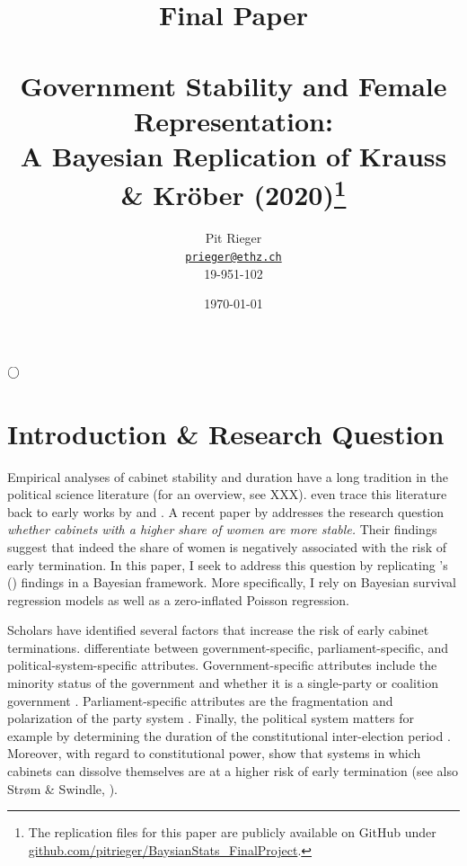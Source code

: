 \documentclass[11pt]{article}
\title{\large Final Paper \\ ~ \\
\LARGE  Government Stability and Female Representation:\\
A Bayesian Replication of Krauss \& Kröber (2020)\footnote[1]{The replication files for this paper are publicly available on GitHub under \url{github.com/pitrieger/BaysianStats_FinalProject}.}}
\author{Pit Rieger\\
    \href{mailto:prieger@ethz.ch}{\texttt{prieger@ethz.ch}}\\
    19-951-102}
\date{\today}
\newcommand\possecite[1]{\citeauthor{#1}'s (\citeyear{#1})}
\begin{document}
\maketitle

\bigskip
\bigskip
\bigskip
\bigskip
\begin{center}
    $\Huge \bigcirc$
\end{center}
\bigskip
\bigskip
\bigskip
\bigskip

\begin{abstract}
{\noindent\itshape
\lipsum[1]
}
\end{abstract}

\bigskip
\bigskip
\bigskip
\bigskip

\newpage


\section{Introduction \& Research Question}
Empirical analyses of cabinet stability and duration have a long tradition in the political science literature (for an overview, see XXX). \textcite{LupiaStrøm1995} even trace this literature back to early works by \textcite{Bryce1921} and \textcite{Lowell1896}. A recent paper by \textcite{KK20} addresses the research question \textit{whether cabinets with a higher share of women are more stable.} Their findings suggest that indeed the share of women is negatively associated with the risk of early termination. In this paper, I seek to address this question by replicating \possecite{KK20} findings in a Bayesian framework. More specifically, I rely on Bayesian survival regression models as well as a zero-inflated Poisson regression. 

Scholars have identified several factors that increase the risk of early cabinet terminations. \textcite{SchleiterMorganJones2009} differentiate between government-specific, parliament-specific, and political-system-specific attributes. Government-specific attributes include the minority status of the government and whether it is a single-party or coalition government \parencite{StromSwindle2002}. Parliament-specific attributes are the fragmentation and polarization of the party system \parencite{KingEtAl1990}. Finally, the political system matters for example by determining the duration of the constitutional inter-election period \parencite{StromSwindle2002}. Moreover, with regard to constitutional power, \textcite{SchleiterMorganJones2009} show that systems in which cabinets can dissolve themselves are at a higher risk of early termination (see also Strøm \& Swindle, \citeyear{StromSwindle2002}).
\end{document}
